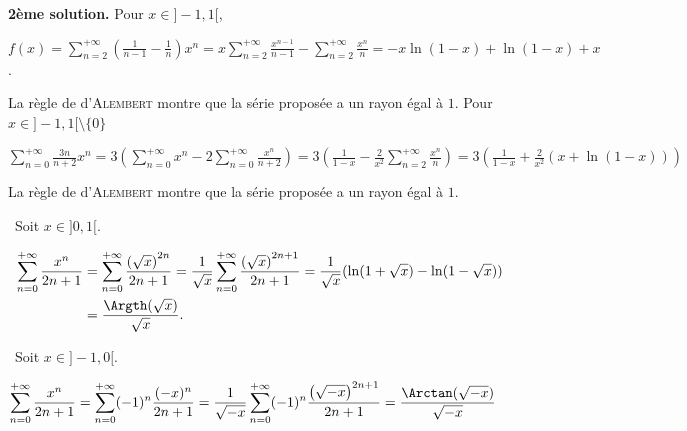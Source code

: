 {{\textbf{2ème solution.} Pour $x\in]-1,1[$, 

\begin{center}
$f(x) =\sum_{n=2}^{+\infty}\left(\frac{1}{n-1}-\frac{1}{n}\right)x^n =x\sum_{n=2}^{+\infty}\frac{x^{n-1}}{n-1}-\sum_{n=2}^{+\infty}\frac{x^n}{n}=-x\ln(1-x) +\ln(1-x) + x$.
\end{center}

\begin{center}
\fbox{
$\forall x\in]-1,1[$, $\sum_{n=2}^{+\infty}\frac{x^n}{n(n-1)}=-x\ln(1-x) +\ln(1-x) + x$.
}
\end{center}
La règle de d'\textsc{Alembert} montre que la série proposée a un rayon égal à $1$.
Pour $x\in]-1,1[\setminus\{0\}$

\begin{center}
$\sum_{n=0}^{+\infty}\frac{3n}{n+2}x^n =3\left(\sum_{n=0}^{+\infty}x^n - 2\sum_{n=0}^{+\infty}\frac{x^n}{n+2}\right) = 3\left(\frac{1}{1-x}- \frac{2}{x^2}\sum_{n=2}^{+\infty}\frac{x^n}{n}\right) = 3\left(\frac{1}{1-x}+\frac{2}{x^2}(x+\ln(1-x))\right)$
\end{center}

\begin{center}
\fbox{
$\forall x\in]-1,1[$, $\sum_{n=0}^{+\infty}\frac{3n}{n+2}x^n=\left\{
\begin{array}{l}3\left(\frac{1}{1-x}+\frac{2}{x^2}(x+\ln(1-x))\right)\;\text{si}\;x\in]-1,1[\setminus\{0\}\\
\rule{0mm}{4mm}0\;\text{si}\;x=0
\end{array}
\right.$.
}
\end{center}
La règle de d'\textsc{Alembert} montre que la série proposée a un rayon égal à $1$.

\textbullet~Soit $x\in]0,1[$.

\begin{align*}\ensuremath
\sum_{n=0}^{+\infty}\frac{x^n}{2n+1}&=\sum_{n=0}^{+\infty}\frac{\left(\sqrt{x}\right)^{2n}}{2n+1}=\frac{1}{\sqrt{x}}\sum_{n=0}^{+\infty}\frac{\left(\sqrt{x}\right)^{2n+1}}{2n+1}=\frac{1}{\sqrt{x}}(\ln(1+\sqrt{x}) -\ln(1-\sqrt{x}))\\
 &=\frac{\Argth(\sqrt{x})}{\sqrt{x}}.
\end{align*}	

\textbullet~Soit $x\in]-1,0[$.

\begin{align*}\ensuremath
\sum_{n=0}^{+\infty}\frac{x^n}{2n+1}&=\sum_{n=0}^{+\infty}(-1)^n\frac{(-x)^n}{2n+1}=\frac{1}{\sqrt{-x}}\sum_{n=0}^{+\infty}(-1)^n\frac{\left(\sqrt{-x}\right)^{2n+1}}{2n+1}=\frac{\Arctan(\sqrt{-x})}{\sqrt{-x}}
\end{align*}

}}
